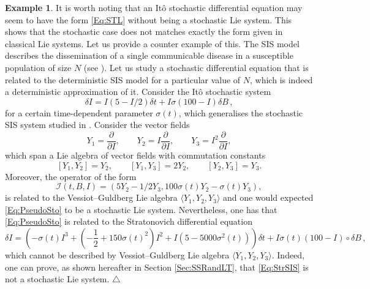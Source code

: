 \documentclass[11pt]{article}
\theoremstyle{plain}
\theoremstyle{definition}
\newcommand\xqed[1]{%
    \leavevmode\unskip\penalty9999 \hbox{}\nobreak\hfill
	\quad\hbox{#1}}
\newcommand\demo{\xqed{$\triangle$}}
\newtheorem{example}[theorem]{Example}
\begin{document}
\begin{example} It is worth noting that an It\^{o} stochastic differential equation may seem to have the form \eqref{Eq:STL} without being a stochastic Lie system. This shows that the stochastic case does not matches exactly the form given in classical Lie systems. Let us provide a counter example of this. The SIS model
describes the dissemination of a single communicable disease in a susceptible population of size $N$ (see \cite{GGHMP11}).
Let us study a stochastic differential equation that is related to the deterministic SIS model for a particular value of $N$, which is indeed a deterministic approximation of it. Consider the It\^{o} stochastic system
\begin{equation}\label{Eq:PseudoSto}
\delta I=I(5-I/2)\delta t+I\sigma(100-I)\delta B\,,
\end{equation}
for a certain time-dependent parameter $\sigma(t)$, which generalises the stochastic SIS system studied in \cite{GGHMP11}. Consider the vector fields
 $$
 Y_1=\frac{\partial}{\partial I},\qquad Y_2=I\frac{\partial}{\partial I},\qquad Y_3=I^2\frac{\partial}{\partial I},
 $$
 which span a Lie algebra of vector fields with commutation constants
 $$
 [Y_1,Y_2]=Y_2,\qquad [Y_1,Y_3]=2Y_2,\qquad [Y_2,Y_3]=Y_3.
 $$
 Moreover, the operator of the form
 $$
 \mathcal{I}(t,B,I)=(5Y_2-1/2Y_3,100\sigma(t) Y_2-\sigma(t) Y_3),
 $$
is related to the Vessiot--Guldberg Lie algebra $\langle Y_1,Y_2,Y_3\rangle$ and one would expected \eqref{Eq:PseudoSto} to be a stochastic Lie system. Nevertheless, one has that \eqref{Eq:PseudoSto} is related to the Stratonovich differential equation
\begin{equation}\label{Eq:StrSIS}
\delta I=\left(-\sigma(t)I^3+\left(-\frac 12+150\sigma(t)^2\right)I^2+I(5-5000\sigma^2(t))\right)\delta t+I\sigma(t)(100-I)\circ \delta B\,,
\end{equation}
which cannot be described by Vessiot--Guldberg Lie algebra $\langle Y_1,Y_2,Y_3\rangle$. Indeed, one can prove, as shown hereafter in Section \ref{Sec:SSRandLT}, that \eqref{Eq:StrSIS} is not a stochastic Lie system.
\demo
\end{example}
\end{document}
